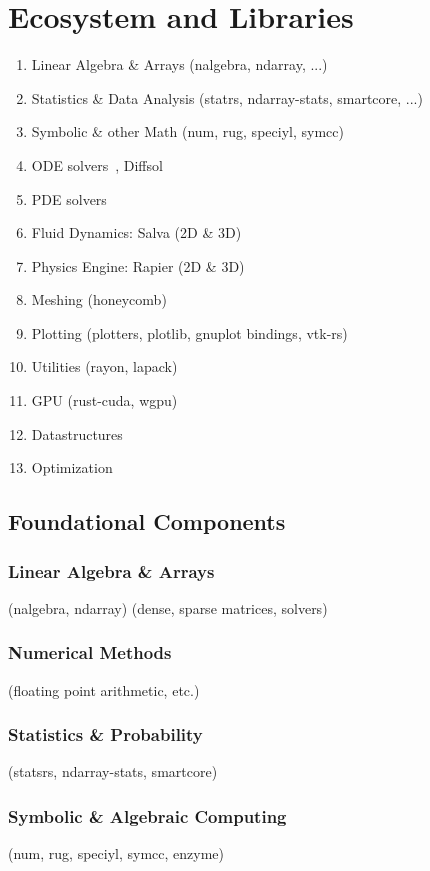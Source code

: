 \documentclass{article}
\begin{document}
\section{Ecosystem and Libraries}

\begin{enumerate}
    \item Linear Algebra \& Arrays (nalgebra, ndarray, ...)
    \item Statistics \& Data Analysis (statrs, ndarray-stats, smartcore, ...)
    \item Symbolic \& other Math (num, rug, speciyl, symcc)
    \item ODE solvers~\cite{Renevey2024}, Diffsol
    \item PDE solvers
    \item Fluid Dynamics: Salva (2D \& 3D)~\cite{Crozet2024}
    \item Physics Engine: Rapier (2D \& 3D)~\cite{Crozet2025}
    \item Meshing (honeycomb)
    \item Plotting (plotters, plotlib, gnuplot bindings, vtk-rs)
    \item Utilities (rayon, lapack)
    \item GPU (rust-cuda, wgpu)
    \item Datastructures
    \item Optimization
\end{enumerate}

\subsection{Foundational Components}
\subsubsection{Linear Algebra \& Arrays}
(nalgebra, ndarray) (dense, sparse matrices, solvers)

\subsubsection{Numerical Methods}
(floating point arithmetic, etc.)

\subsubsection{Statistics \& Probability}
(statsrs, ndarray-stats, smartcore)

\subsubsection{Symbolic \& Algebraic Computing}
(num, rug, speciyl, symcc, enzyme)
\end{document}
